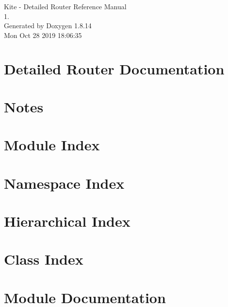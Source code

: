 \documentclass[a4paper]{asimbook}
\begin{document}
   \begin{titlepage}
     \vspace*{7cm}
     \begin{center}
     {\Large Kite -\/ Detailed Router Reference Manual\\[1ex]\large 1. }\\
     \vspace*{1cm}
     {\large Generated by Doxygen 1.8.14}\\
     \vspace*{0.5cm}
     {\small Mon Oct 28 2019 18:06:35}\\
     \end{center}
   \end{titlepage}

   \clearemptydoublepage

   \tableofcontents
   \clearemptydoublepage

\section{Detailed Router Documentation}
\label{index}\hypertarget{index}{}
\section{Notes}
\label{pageNotes}

\section{Module Index}

\section{Namespace Index}

\section{Hierarchical Index}

\section{Class Index}

\section{Module Documentation}


\end{document}
